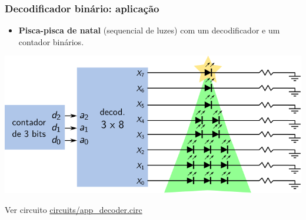 \documentclass{beamer}
\begin{document}
\begin{frame}
\frametitle{Decodificador binário: aplicação}

\begin{itemize}
\item \textbf{Pisca-pisca de natal} (sequencial de luzes) com um
decodificador e um contador binários.
\end{itemize}

\begin{center}
\includegraphics{images/sequencial}
\end{center}

Ver circuito \url{circuits/app_decoder.circ}

\end{frame}
\end{document}
